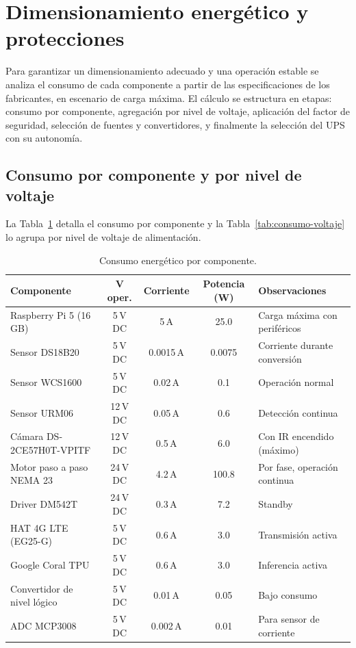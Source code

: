 \section{Dimensionamiento energético y protecciones}\label{sec:dimensionamiento}

Para garantizar un dimensionamiento adecuado y una operación estable se analiza el consumo de cada
componente a partir de las especificaciones de los fabricantes, en escenario de carga máxima. El cálculo se
estructura en etapas: consumo por componente, agregación por nivel de voltaje, aplicación del factor de
seguridad, selección de fuentes y convertidores, y finalmente la selección del UPS con su autonomía.

\subsection{Consumo por componente y por nivel de voltaje}

La Tabla~\ref{tab:consumo-componente} detalla el consumo por componente y la
Tabla~\ref{tab:consumo-voltaje} lo agrupa por nivel de voltaje de alimentación.

\begin{table}[H]
  \centering
  \caption{Consumo energético por componente.}
  \label{tab:consumo-componente}
  \footnotesize
  \begin{tabular}{@{}lcccl@{}}
    \toprule
    \textbf{Componente} & \textbf{V oper.} & \textbf{Corriente} & \textbf{Potencia (W)} & \textbf{Observaciones}\\
    \midrule
    Raspberry Pi 5 (16\,GB) & 5\,V DC & 5\,A & 25.0 & Carga máxima con periféricos\\
    Sensor DS18B20 & 5\,V DC & 0.0015\,A & 0.0075 & Corriente durante conversión\\
    Sensor WCS1600 & 5\,V DC & 0.02\,A & 0.1 & Operación normal\\
    Sensor URM06 & 12\,V DC & 0.05\,A & 0.6 & Detección continua\\
    Cámara DS-2CE57H0T-VPITF & 12\,V DC & 0.5\,A & 6.0 & Con IR encendido (máximo)\\
    Motor paso a paso NEMA 23 & 24\,V DC & 4.2\,A & 100.8 & Por fase, operación continua\\
    Driver DM542T & 24\,V DC & 0.3\,A & 7.2 & Standby\\
    HAT 4G LTE (EG25-G) & 5\,V DC & 0.6\,A & 3.0 & Transmisión activa\\
    Google Coral TPU & 5\,V DC & 0.6\,A & 3.0 & Inferencia activa\\
    Convertidor de nivel lógico & 5\,V DC & 0.01\,A & 0.05 & Bajo consumo\\
    ADC MCP3008 & 5\,V DC & 0.002\,A & 0.01 & Para sensor de corriente\\
    \bottomrule
  \end{tabular}
\end{table}

